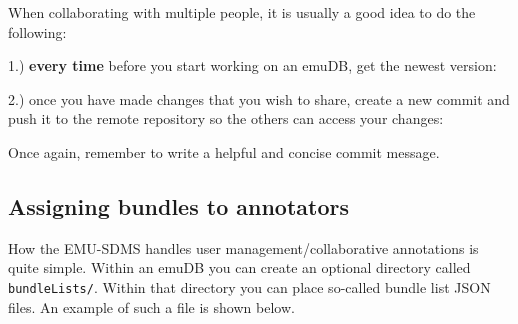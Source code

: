 \documentclass[
]{book}
\newenvironment{Shaded}{\begin{snugshade}}{\end{snugshade}}
\newcommand{\AttributeTok}[1]{\textcolor[rgb]{0.77,0.63,0.00}{#1}}
\newcommand{\CommentTok}[1]{\textcolor[rgb]{0.56,0.35,0.01}{\textit{#1}}}
\newcommand{\FunctionTok}[1]{\textcolor[rgb]{0.00,0.00,0.00}{#1}}
\newcommand{\NormalTok}[1]{#1}
\newcommand{\SpecialCharTok}[1]{\textcolor[rgb]{0.00,0.00,0.00}{#1}}
\newcommand{\StringTok}[1]{\textcolor[rgb]{0.31,0.60,0.02}{#1}}
\begin{document}
When collaborating with multiple people, it is usually a good idea to do the following:

1.) \textbf{every time} before you start working on an emuDB, get the newest version:

\begin{Shaded}
\end{Shaded}

2.) once you have made changes that you wish to share, create a new commit and push it to the remote repository so the others can access your changes:

\begin{Shaded}
\end{Shaded}

Once again, remember to write a helpful and concise commit message.

\hypertarget{assigning-bundles-to-annotators}{%
\subsection{Assigning bundles to annotators}\label{assigning-bundles-to-annotators}}

How the EMU-SDMS handles user management/collaborative annotations is quite simple. Within an emuDB you can create an optional directory called \texttt{bundleLists/}. Within that directory you can place so-called bundle list JSON files. An example of such a file is shown below.
\end{document}
